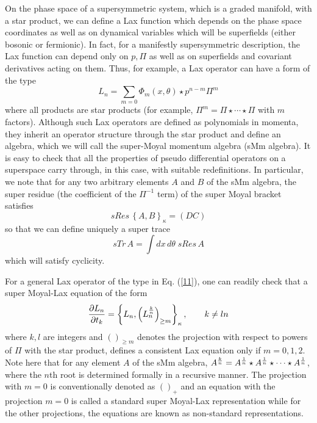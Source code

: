 \documentclass[a4paper,11pt]{article}
\begin{document}
On the phase space of a supersymmetric system, which is a graded
manifold, with a star product, we can define a Lax function which 
depends on the phase space coordinates as well as on dynamical
variables which will be superfields (either bosonic or fermionic). In
fact, for a manifestly supersymmetric description, the Lax function
can depend only on $p,\Pi$ as well as on superfields and 
covariant derivatives acting on them. Thus, for example, a  
Lax operator can have a form of the type
\begin{equation}
L_{n} = \sum_{m=0} \Phi_{m}(x,\theta)\star p^{n-m}\Pi^{m}\label{11}
\end{equation}
where all products are star products (for example,
$\Pi^{m}=\Pi\star\cdots \star \Pi$ with $m$ factors). Although such
Lax  operators are defined as polynomials in momenta,
they inherit an operator structure through the star product and define
an algebra, which we will call the super-Moyal momentum algebra (sMm
algebra). It is easy to check that all the properties of pseudo
differential operators on a superspace carry through, in this case,
with suitable redefinitions. In particular, we note that for any two
arbitrary elements $A$ and $B$ of the sMm algebra, the super residue
(the coefficient of the $\Pi^{-1}$ term) of the super Moyal bracket
satisfies
\begin{equation}
sRes\,\left\{A,B\right\}_{\kappa} = (DC)
\end{equation}
so that we can define uniquely a super trace
\begin{equation}
sTr\,A = \int dx\,d\theta\;sRes\,A\label{11'}
\end{equation}
which will satisfy cyclicity.

For a general Lax operator of the type in Eq. (\ref{11}), one can
readily check that a super Moyal-Lax equation of the form
\begin{equation}
{\partial L_{n}\over \partial t_{k}} = \left\{L_{n}, \left(L_{n}^{k\over
n}\right)_{\geq m}\right\}_{\kappa},\qquad k\neq ln
\end{equation}
where $k,l$ are integers and $()_{\geq m}$ denotes the projection with
respect to powers of $\Pi$ with the star product, defines a consistent
Lax equation only if $m=0,1,2$. Note here that for any element $A$ of the
sMm algebra, $A^{k\over n} = A^{1\over n}\star A^{1\over n}\star\cdots
\star A^{1\over n}$, where the $n$th root is determined formally in a
recursive manner. The projection with $m=0$ is conventionally denoted
as $()_{+}$ and an equation with the projection $m=0$ is called a
standard super Moyal-Lax representation while for the other
projections, the equations are known as non-standard representations.
\end{document}
